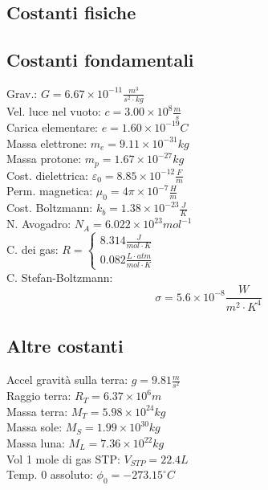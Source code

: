 \documentclass{article}
\begin{document}
\begin{small}
\begin{multicols}{3}
\section{Costanti fisiche}
	\subsection{Costanti fondamentali}
		Grav.: $ G = 6.67 \times 10^{-11} \frac{ m^3 }{ s^2 \cdot kg } $ \\
		Vel. luce nel vuoto: $ c = 3.00 \times 10^{8} \frac{ m }{ s } $ \\
		Carica elementare: $ e = 1.60 \times 10^{-19} C $ \\
		Massa elettrone: $ m_e = 9.11 \times 10^{-31} kg $ \\
		Massa protone: $ m_p = 1.67 \times 10^{-27} kg $ \\
		Cost. dielettrica: $ \varepsilon_0 = 8.85 \times 10^{-12} \frac{ F }{ m } $ \\
		Perm. magnetica: $ \mu_0 = 4 \pi \times 10^{-7} \frac{ H }{ m } $ \\
		Cost. Boltzmann: $ k_b = 1.38 \times 10^{-23} \frac{ J }{ K } $ \\
		N. Avogadro: $ N_A = 6.022 \times 10^{23} mol^{-1} $ \\
		C. dei gas: $ R = \begin{cases} 8.314 \frac{ J }{ mol \cdot K } \\ 0.082 \frac{ L \cdot atm }{ mol \cdot K } \end{cases} $ \\
		C. Stefan-Boltzmann: \[ \sigma = 5.6 \times 10^{-8} \frac{ W }{ m^2 \cdot K^4 } \]
	\subsection{Altre costanti}
		Accel gravità sulla terra: $ g = 9.81 \frac{ m }{ s^2 } $ \\
		Raggio terra: $ R_T = 6.37 \times 10^{6} m $ \\
		Massa terra: $ M_T = 5.98 \times 10^{24} kg $ \\
		Massa sole: $ M_S = 1.99 \times 10^{30} kg $ \\
		Massa luna: $ M_L = 7.36 \times 10^{22} kg $ \\
		Vol 1 mole di gas STP: $ V_{STP} = 22.4 L $ \\
		Temp. 0 assoluto: $ \phi_0 = -273.15 ^{\circ} C $

\end{multicols}
\end{small}
\end{document}
